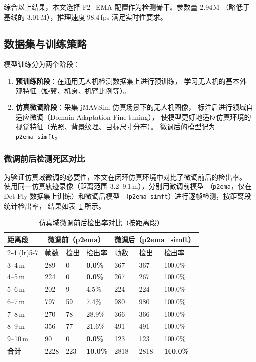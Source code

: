 \documentclass[12pt, a4paper]{ctexart}
\begin{document}
综合以上结果，本文选择 P2+EMA 配置作为检测骨干。参数量 2.94\,M
（略低于基线的 3.01\,M），推理速度 98.4\,fps 满足实时性要求。

\subsection{数据集与训练策略}

模型训练分为两个阶段：

\begin{enumerate}
  \item \textbf{预训练阶段}：在通用无人机检测数据集上进行预训练，
        学习无人机的基本外观特征（旋翼、机身、机臂比例等）。

  \item \textbf{仿真微调阶段}：采集 jMAVSim 仿真场景下的无人机图像，
        标注后进行领域自适应微调（Domain Adaptation Fine-tuning），
        使模型更好地适应仿真环境的视觉特征（光照、背景纹理、目标尺寸分布）。
        微调后的模型记为 \texttt{p2ema\_simft}。
\end{enumerate}

\subsubsection{微调前后检测死区对比}
\label{subsubsec:deadzone}

为验证仿真域微调的必要性，本文在闭环仿真环境中对比了微调前后的检出率。
使用同一仿真轨迹录像（距离范围 3.2--9.1\,m），分别用微调前模型
（\texttt{p2ema}，仅在 Det-Fly 数据集上训练）和微调后模型
（\texttt{p2ema\_simft}）进行逐帧检测，按距离段统计检出率，
结果如表~\ref{tab:finetune_compare} 所示。

\begin{table}[H]
\centering
\caption{仿真域微调前后检出率对比（按距离段）}
\label{tab:finetune_compare}
\small
\begin{tabular}{p{1.5cm}p{1.2cm}p{1.0cm}p{1.2cm}p{1.2cm}p{1.0cm}p{1.2cm}}
\toprule
\multirow{2}{*}{\textbf{距离段}} & \multicolumn{3}{c}{\textbf{微调前（p2ema）}} & \multicolumn{3}{c}{\textbf{微调后（p2ema\_simft）}} \\
\cmidrule(lr){2-4} \cmidrule(lr){5-7}
 & 帧数 & 检出 & 检出率 & 帧数 & 检出 & 检出率 \\
\midrule
3--4\,m & 289 & 0 & \textbf{0.0\%} & 367 & 367 & 100.0\% \\
4--5\,m & 224 & 0 & \textbf{0.0\%} & 267 & 267 & 100.0\% \\
5--6\,m & 202 & 9 & 4.5\% & 224 & 224 & 100.0\% \\
6--7\,m & 797 & 59 & 7.4\% & 980 & 980 & 100.0\% \\
7--8\,m & 270 & 78 & 28.9\% & 366 & 366 & 100.0\% \\
8--9\,m & 356 & 77 & 21.6\% & 491 & 491 & 100.0\% \\
9--10\,m & 90 & 0 & \textbf{0.0\%} & 123 & 123 & 100.0\% \\
\midrule
\textbf{合计} & 2228 & 223 & \textbf{10.0\%} & 2818 & 2818 & \textbf{100.0\%} \\
\bottomrule
\end{tabular}
\end{table}
\end{document}
